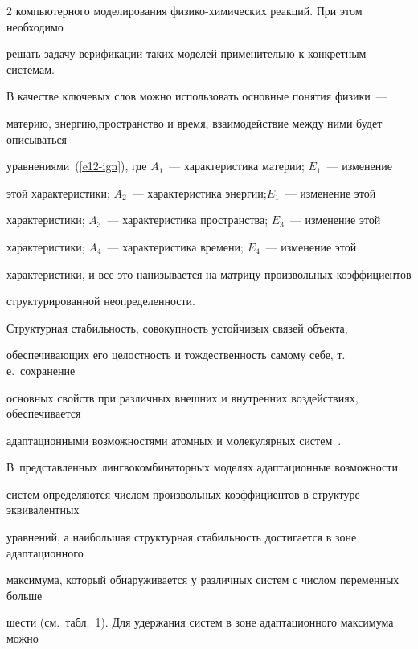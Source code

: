 \begin{multicols}{2}
компьютерного моделирования фи\-зи\-ко-хи\-ми\-че\-ских реакций. При этом необходимо 


решать задачу верификации таких моделей применительно к конкретным сис\-те\-мам.


      


      В качестве ключевых слов можно использовать основные понятия физики~--- 


материю, энергию,\linebreak пространство и время, взаимодействие между ними будет описываться 


уравнениями~(\ref{e12-ign}), где $A_1$~--- характеристика материи; $E_1$~--- изменение 


этой характеристики; $A_2$~--- характеристика энергии;\linebreak $E_1$~--- изменение этой 


характеристики; $A_3$~--- характеристика пространства; $E_3$~--- изменение этой 


характеристики; $A_4$~--- характеристика времени; $E_4$~--- изменение этой 


характеристики, и все это нанизывается на матрицу произвольных коэффициентов 


структурированной неопределенности. 


      


      Структурная стабильность, совокупность устойчивых связей объекта, 


обеспечивающих его целостность и тождественность самому себе, т.\,е.\ сохранение 


основных свойств при различных внешних и внутренних воздействиях, обеспечивается 


адап\-та\-ци\-он\-ны\-ми возможностями атомных и молекулярных систем~\cite{16-ign}. 


В~представленных линг\-во\-ком\-би\-на\-тор\-ных моделях адап\-та\-ци\-он\-ные возможности 


систем определяются числом произвольных коэффициентов в структуре эквивалентных 


уравнений, а наибольшая структурная стабильность достигается в зоне адап\-та\-ци\-он\-но\-го 


максимума, который обнаруживается у различных сис\-тем с чис\-лом переменных больше 


шести (см.\ табл.~1). Для удержания сис\-тем в зоне адаптационного максимума можно 



\end{multicols}
